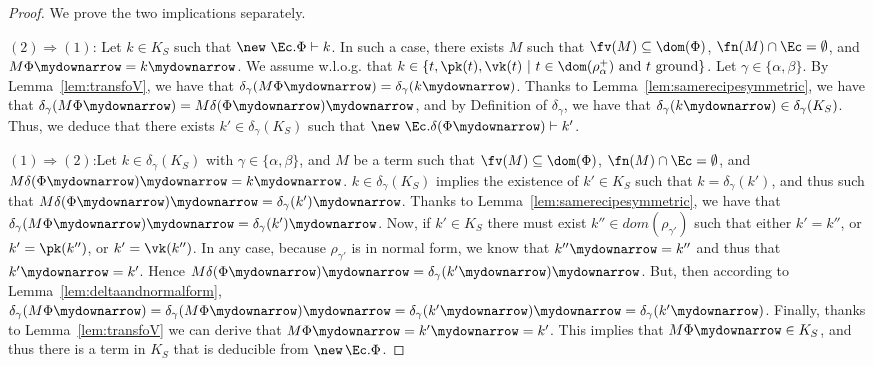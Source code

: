\begin{proof}
We prove the two implications separately.

\noindent $(2) \Rightarrow (1)$: Let $k \in K_S$ such that $\new\
\Ec. \Phi \vdash k$. In such a case, there exists $M$ such that
$\fv(M) \subseteq \dom(\Phi)$, $\fn(M) \cap \Ec = \emptyset$, and
$M\Phi\mydownarrow = k\mydownarrow$. We assume w.l.o.g. that $k \in
\{t, \pk(t),\vk(t) ~|~ t \in \dom(\rho^+_\alpha) \mbox{ and $t$
  ground}\}$. Let $\gamma \in \{\alpha,\beta\}$. 
By Lemma~\ref{lem:transfoV}, we
have that {$\delta_\gamma(M\Phi\mydownarrow) =
\delta_\gamma(k\mydownarrow)$.}
Thanks to Lemma~\ref{lem:samerecipesymmetric}, we have that
{$\delta_\gamma(M\Phi\mydownarrow) = M\delta(\Phi\mydownarrow)\mydownarrow$}, and by
Definition of {$\delta_\gamma$}, we have that
{$\delta_\gamma(k\mydownarrow) \in \delta_\gamma(K_S)$}. Thus, we deduce that there
exists {$k' \in \delta_\gamma(K_S)$} such that $\new\ \Ec. \delta(\Phi\mydownarrow) \vdash
k'$.

\smallskip{}

\noindent $(1) \Rightarrow (2)$:{Let $k \in \delta_\gamma(K_S)$ with $\gamma \in \{\alpha,\beta\}$}, and $M$ be a term such that $\fv(M) \subseteq \dom(\Phi)$, $\fn(M) \cap \Ec = \emptyset$, and $M\delta(\Phi\mydownarrow)\mydownarrow = k\mydownarrow$. {$k \in \delta_\gamma(K_S)$ implies the existence of $k' \in K_S$ such that $k =\delta_\gamma(k')$, and thus such that $M\delta(\Phi\mydownarrow)\mydownarrow = \delta_\gamma(k')\mydownarrow$. Thanks to Lemma~\ref{lem:samerecipesymmetric}, we have that $\delta_\gamma(M\Phi\mydownarrow)\mydownarrow = \delta_\gamma(k')\mydownarrow$. Now, if $k'\in K_S$ there must exist $k''\in dom(\rho_{\gamma'})$ such that either $k' = k''$, or $k' = \pk(k'')$, or $k'=\vk(k'')$. In any case, because $\rho_{\gamma'}$ is in normal form, we know that $k''\mydownarrow = k''$ and thus that $k'\mydownarrow = k'$. Hence $M\delta(\Phi\mydownarrow)\mydownarrow = \delta_\gamma(k'\mydownarrow)\mydownarrow$. But, then according to Lemma~\ref{lem:deltaandnormalform}, $\delta_\gamma(M\Phi\mydownarrow) = \delta_\gamma(M\Phi\mydownarrow)\mydownarrow = \delta_\gamma(k'\mydownarrow)\mydownarrow = \delta_\gamma(k'\mydownarrow)$. Finally, thanks to Lemma~\ref{lem:transfoV} we can derive that $M\Phi\mydownarrow = k'\mydownarrow = k'$.} This implies that $M\Phi\mydownarrow \in K_S$, and thus there is a term in $K_S$ that is deducible from $\new\, \Ec. \Phi$.
\end{proof}



